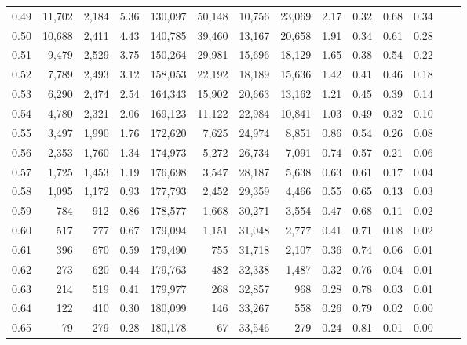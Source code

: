 \begin{tabular}{rrrrrrrrrrrrrr}
0.49 &  11,702 &  2,184 &    5.36 &  130,097 &   50,148 &  10,756 &  23,069 &  2.17 &  0.32 &  0.68 &      0.34 \\
0.50 &  10,688 &  2,411 &    4.43 &  140,785 &   39,460 &  13,167 &  20,658 &  1.91 &  0.34 &  0.61 &      0.28 \\
0.51 &   9,479 &  2,529 &    3.75 &  150,264 &   29,981 &  15,696 &  18,129 &  1.65 &  0.38 &  0.54 &      0.22 \\
0.52 &   7,789 &  2,493 &    3.12 &  158,053 &   22,192 &  18,189 &  15,636 &  1.42 &  0.41 &  0.46 &      0.18 \\
0.53 &   6,290 &  2,474 &    2.54 &  164,343 &   15,902 &  20,663 &  13,162 &  1.21 &  0.45 &  0.39 &      0.14 \\
0.54 &   4,780 &  2,321 &    2.06 &  169,123 &   11,122 &  22,984 &  10,841 &  1.03 &  0.49 &  0.32 &      0.10 \\
0.55 &   3,497 &  1,990 &    1.76 &  172,620 &    7,625 &  24,974 &   8,851 &  0.86 &  0.54 &  0.26 &      0.08 \\
0.56 &   2,353 &  1,760 &    1.34 &  174,973 &    5,272 &  26,734 &   7,091 &  0.74 &  0.57 &  0.21 &      0.06 \\
0.57 &   1,725 &  1,453 &    1.19 &  176,698 &    3,547 &  28,187 &   5,638 &  0.63 &  0.61 &  0.17 &      0.04 \\
0.58 &   1,095 &  1,172 &    0.93 &  177,793 &    2,452 &  29,359 &   4,466 &  0.55 &  0.65 &  0.13 &      0.03 \\
0.59 &     784 &    912 &    0.86 &  178,577 &    1,668 &  30,271 &   3,554 &  0.47 &  0.68 &  0.11 &      0.02 \\
0.60 &     517 &    777 &    0.67 &  179,094 &    1,151 &  31,048 &   2,777 &  0.41 &  0.71 &  0.08 &      0.02 \\
0.61 &     396 &    670 &    0.59 &  179,490 &      755 &  31,718 &   2,107 &  0.36 &  0.74 &  0.06 &      0.01 \\
0.62 &     273 &    620 &    0.44 &  179,763 &      482 &  32,338 &   1,487 &  0.32 &  0.76 &  0.04 &      0.01 \\
0.63 &     214 &    519 &    0.41 &  179,977 &      268 &  32,857 &     968 &  0.28 &  0.78 &  0.03 &      0.01 \\
0.64 &     122 &    410 &    0.30 &  180,099 &      146 &  33,267 &     558 &  0.26 &  0.79 &  0.02 &      0.00 \\
0.65 &      79 &    279 &    0.28 &  180,178 &       67 &  33,546 &     279 &  0.24 &  0.81 &  0.01 &      0.00 \\

\end{tabular}
